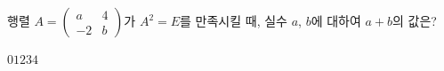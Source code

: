 \hspace*{2mm}\begin{minipage}[t]{\dimexpr\linewidth-2mm\relax}\vspace{0pt}
행렬 $A=\begin{pmatrix} a & 4 \\ -2 & b \end{pmatrix}$가 $A^2=E$를 만족시킬 때, 실수 $a$, $b$에 대하여 $a+b$의 값은?
\begin{choices32}{$0$}{$1$}{$2$}{$3$}{$4$}\end{choices32}\end{minipage}
